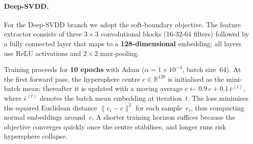 
\paragraph{Deep-SVDD.}
For the Deep-SVDD branch we adopt the soft-boundary objective.  
The feature extractor consists of three $3{\times}3$ convolutional
blocks (16-32-64 filters) followed by a fully connected layer that maps
to a \textbf{128-dimensional} embedding; all layers use ReLU activations
and $2{\times}2$ max-pooling.  

Training proceeds for \textbf{10 epochs} with Adam
($\alpha = 1\!\times\!10^{-4}$, batch size~64).
At the first forward pass, the hypersphere centre $c\!\in\!\mathbb{R}^{128}$
is initialised as the mini-batch mean; thereafter it is updated with a
moving average  
$c \leftarrow 0.9\,c + 0.1\,\bar{e}^{(t)}$,  
where $\bar{e}^{(t)}$ denotes the batch mean embedding at iteration~$t$.
The loss minimises the squared Euclidean distance
$\lVert e_i - c\rVert^{2}$ for each sample~$e_i$, thus compacting normal
embeddings around~$c$.  
A shorter training horizon suffices because the objective converges
quickly once the centre stabilises, and longer runs risk
hypersphere collapse.

\vspace{0.4em}
\noindent